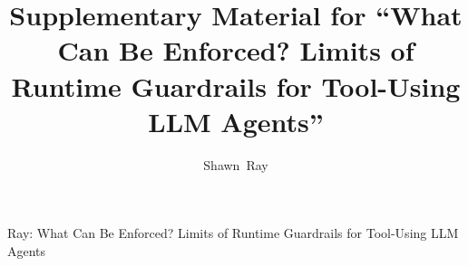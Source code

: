 \documentclass[10pt,journal,compsoc]{IEEEtran}
\begin{document}
\title{Supplementary Material for ``What Can Be Enforced? Limits of Runtime Guardrails for Tool-Using LLM Agents''}
\author{Shawn~Ray}
%
{Ray: What Can Be Enforced? Limits of Runtime Guardrails for Tool-Using LLM Agents}
\maketitle
\renewcommand{\appendixname}{Supplement}\appendices
\renewcommand{\thetable}{S\arabic{table}}
\renewcommand{\thefigure}{S\arabic{figure}}
\renewcommand{\thelemma}{S\arabic{lemma}}
\renewcommand{\theremark}{S\arabic{remark}}
\renewcommand{\theproposition}{S\arabic{proposition}}
\def\theHtable{S\arabic{table}}\def\theHfigure{S\arabic{figure}}\def\theHlemma{S\arabic{lemma}}%
\def\theHremark{S\arabic{remark}}\def\theHproposition{S\arabic{proposition}}









\end{document}
